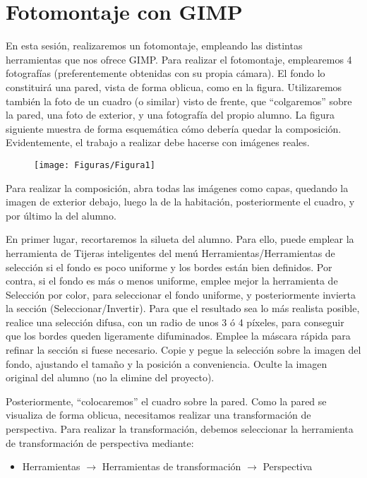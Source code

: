 \documentclass[es,practica]{uah}
\begin{document}


\maketitle


\section{Fotomontaje con GIMP}

En esta sesión, realizaremos un fotomontaje, empleando las distintas herramientas que nos ofrece GIMP. Para realizar el fotomontaje, emplearemos 4 fotografías (preferentemente obtenidas con su propia cámara). El fondo lo constituirá una pared, vista de forma oblicua, como en la figura. Utilizaremos también la foto de un cuadro (o similar) visto de frente, que ``colgaremos'' sobre la pared, una foto de exterior, y una fotografía del propio alumno. La figura siguiente muestra de forma esquemática cómo debería quedar la composición. Evidentemente, el trabajo a realizar debe hacerse con imágenes reales.

\begin{figure}[h!]
  \centering
  \texttt{[image: Figuras/Figura1]}
\end{figure}

Para realizar la composición, abra todas las imágenes como capas, quedando la imagen de exterior debajo, luego la de la habitación, posteriormente el cuadro, y por último la del alumno.

En primer lugar, recortaremos la silueta del alumno. Para ello, puede emplear la herramienta de Tijeras inteligentes del menú Herramientas/Herramientas de selección si el fondo es poco uniforme y los bordes están bien definidos. Por contra, si el fondo es más o menos uniforme, emplee mejor la herramienta de Selección por color, para seleccionar el fondo uniforme, y posteriormente invierta la sección (Seleccionar/Invertir). Para que el resultado sea lo más realista posible, realice una selección difusa, con un radio de unos 3 ó 4 píxeles, para conseguir que los bordes queden ligeramente difuminados. Emplee la máscara rápida para refinar la sección si fuese necesario. Copie y pegue la selección sobre la imagen del fondo, ajustando el tamaño y la posición a conveniencia. Oculte la imagen original del alumno (no la elimine del proyecto).

Posteriormente, ``colocaremos'' el cuadro sobre la pared. Como la pared se visualiza de forma oblicua, necesitamos realizar una transformación de perspectiva. Para realizar la transformación, debemos seleccionar la herramienta de transformación de perspectiva mediante:
\begin{itemize}
	\item Herramientas $\rightarrow$ Herramientas de transformación $\rightarrow$ Perspectiva
\end{itemize}
\end{document}
